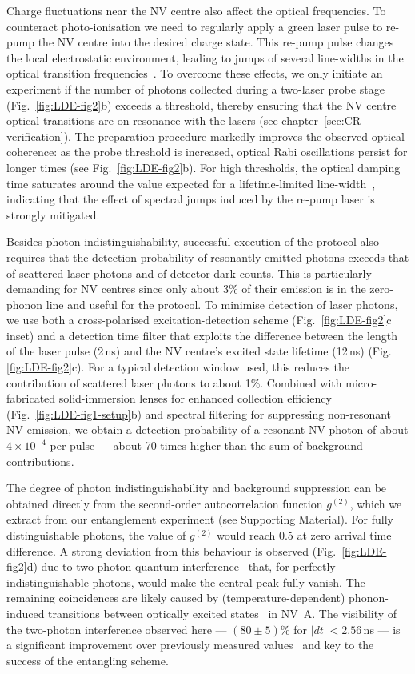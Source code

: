 Charge fluctuations near the NV centre also affect the optical frequencies. To counteract photo-ionisation we need to regularly apply a green laser pulse to re-pump the NV centre into the desired charge state. This re-pump pulse changes the local electrostatic environment, leading to jumps of several line-widths in the optical transition frequencies~\cite{Robledo2010}. To overcome these effects, we only initiate an experiment if the number of photons collected during a two-laser probe stage (Fig.~\ref{fig:LDE-fig2}b) exceeds a threshold, thereby ensuring that the NV centre optical transitions are on resonance with the lasers (see chapter~\ref{sec:CR-verification}). The preparation procedure markedly improves the observed optical coherence: as the probe threshold is increased, optical Rabi oscillations persist for longer times (see Fig.~\ref{fig:LDE-fig2}b). For high thresholds, the optical damping time saturates around the value expected for a lifetime-limited line-width~\cite{Robledo2010}, indicating that the effect of spectral jumps induced by the re-pump laser is strongly mitigated.

Besides photon indistinguishability, successful execution of the protocol also requires that the detection probability of resonantly emitted photons exceeds that of scattered laser photons and of detector dark counts. This is particularly demanding for NV centres since only about 3\% of their emission is in the zero-phonon line and useful for the protocol. To minimise detection of laser photons, we use both a cross-polarised excitation-detection scheme (Fig.~\ref{fig:LDE-fig2}c inset) and a detection time filter that exploits the difference between the length of the laser pulse (2$\,$ns) and the NV centre's excited state lifetime (12\,ns) (Fig.\,\ref{fig:LDE-fig2}c). For a typical detection window used, this reduces the contribution of scattered laser photons to about 1\%. Combined with micro-fabricated solid-immersion lenses for enhanced collection efficiency (Fig.~\ref{fig:LDE-fig1-setup}b) and spectral filtering for suppressing non-resonant NV emission, we obtain a detection probability of a resonant NV photon of about $4\times10^{-4}$ per pulse --- about 70 times higher than the sum of background contributions.

The degree of photon indistinguishability and background suppression can be obtained directly from the second-order autocorrelation function $g^{(2)}$, which we extract from our entanglement experiment (see Supporting Material). For fully distinguishable photons, the value of $g^{(2)}$ would reach 0.5 at zero arrival time difference. A strong deviation from this behaviour is observed (Fig.~\ref{fig:LDE-fig2}d) due to two-photon quantum interference~\cite{Hong1987} that, for perfectly indistinguishable photons, would make the central peak fully vanish. The remaining coincidences are likely caused by (temperature-dependent) phonon-induced transitions between optically excited states~\cite{Fu2009} in NV~A. The visibility of the two-photon interference observed here --- $(80\pm5)$\% for $|dt| < 2.56\,$ns --- is a significant improvement over previously measured values~\cite{Bernien2012a,Sipahigil2012} and key to the success of the entangling scheme.

